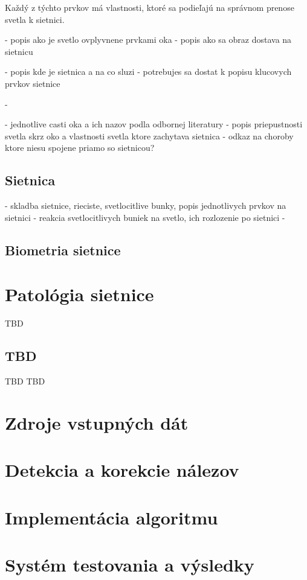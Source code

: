 Každý z týchto prvkov má vlastnosti, ktoré sa podieľajú na správnom prenose svetla k sietnici. 


- popis ako je svetlo ovplyvnene prvkami oka
- popis ako sa obraz dostava na sietnicu

- popis kde je sietnica a na co sluzi \cite{vlast_oka}
- potrebujes sa dostat k popisu klucovych prvkov sietnice

- 

- jednotlive casti oka a ich nazov podla odbornej literatury
- popis priepustnosti svetla skrz oko a vlastnosti svetla ktore zachytava sietnica
- odkaz na choroby ktore niesu spojene priamo so sietnicou?

\section{Sietnica}\label{sec:sietnica}
- skladba sietnice, rieciste, svetlocitlive bunky, popis jednotlivych prvkov na sietnici
- reakcia svetlocitlivych buniek na svetlo, ich rozlozenie po sietnici
- 

\section{Biometria sietnice}\label{sec:bioret}

\chapter{Patológia sietnice}\label{ch:kap2}
TBD\cite{prim}
\section{TBD}
TBD\cite{sec}
TBD\cite{bio}

\chapter{Zdroje vstupných dát}\label{ch:kap3}

\chapter{Detekcia a korekcie nálezov}\label{ch:kap4}

\chapter{Implementácia algoritmu}

\chapter{Systém testovania a výsledky}\label{ch:kap5}

